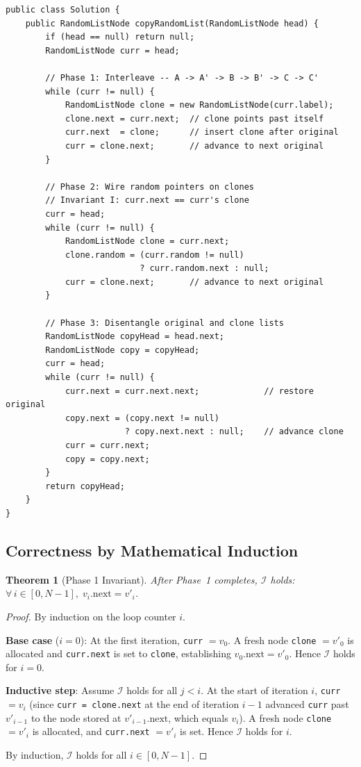 \documentclass[10pt,journal,compsoc]{IEEEtran}
\newtheorem{theorem}{Theorem}
\begin{document}
\begin{verbatim}
public class Solution {
    public RandomListNode copyRandomList(RandomListNode head) {
        if (head == null) return null;
        RandomListNode curr = head;

        // Phase 1: Interleave -- A -> A' -> B -> B' -> C -> C'
        while (curr != null) {
            RandomListNode clone = new RandomListNode(curr.label);
            clone.next = curr.next;  // clone points past itself
            curr.next  = clone;      // insert clone after original
            curr = clone.next;       // advance to next original
        }

        // Phase 2: Wire random pointers on clones
        // Invariant I: curr.next == curr's clone
        curr = head;
        while (curr != null) {
            RandomListNode clone = curr.next;
            clone.random = (curr.random != null)
                           ? curr.random.next : null;
            curr = clone.next;       // advance to next original
        }

        // Phase 3: Disentangle original and clone lists
        RandomListNode copyHead = head.next;
        RandomListNode copy = copyHead;
        curr = head;
        while (curr != null) {
            curr.next = curr.next.next;             // restore original
            copy.next = (copy.next != null)
                        ? copy.next.next : null;    // advance clone
            curr = curr.next;
            copy = copy.next;
        }
        return copyHead;
    }
}
\end{verbatim}

\subsection{Correctness by Mathematical Induction}

\begin{theorem}[Phase 1 Invariant]
\label{thm:inv}
After Phase~1 completes, $\mathcal{I}$ holds: $\forall\,i \in [0, N{-}1],\; v_i.\mathrm{next} = v'_i$.
\end{theorem}

\begin{proof}
By induction on the loop counter $i$.

\textbf{Base case} ($i = 0$): At the first iteration, \texttt{curr} $= v_0$. A fresh node \texttt{clone} $= v'_0$ is allocated and \texttt{curr.next} is set to \texttt{clone}, establishing $v_0.\mathrm{next} = v'_0$. Hence $\mathcal{I}$ holds for $i = 0$.

\textbf{Inductive step}: Assume $\mathcal{I}$ holds for all $j < i$. At the start of iteration $i$, \texttt{curr} $= v_i$ (since \texttt{curr = clone.next} at the end of iteration $i{-}1$ advanced \texttt{curr} past $v'_{i-1}$ to the node stored at $v'_{i-1}.\mathrm{next}$, which equals $v_i$). A fresh node \texttt{clone} $= v'_i$ is allocated, and \texttt{curr.next} $= v'_i$ is set. Hence $\mathcal{I}$ holds for $i$.

By induction, $\mathcal{I}$ holds for all $i \in [0, N{-}1]$.
\end{proof}
\end{document}

